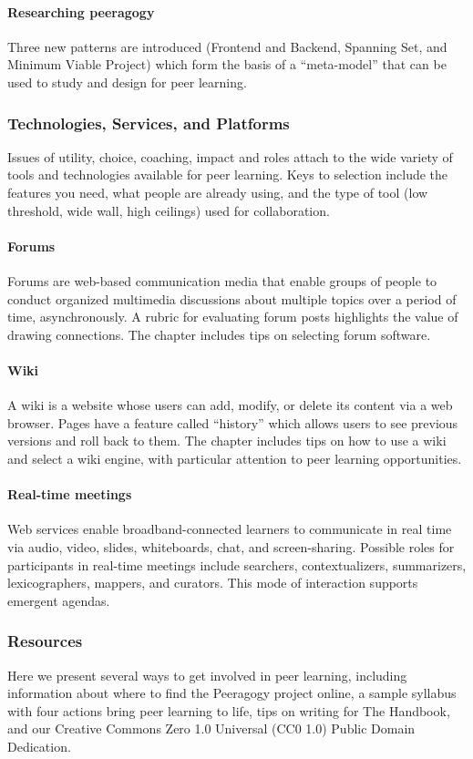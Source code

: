 \paragraph{Researching peeragogy} Three new patterns are introduced
(Frontend and Backend, Spanning Set, and Minimum Viable Project) which
form the basis of a ``meta-model'' that can be used to study and
design for peer learning.

\subsubsection{Technologies, Services, and Platforms}

\noindent Issues of utility, choice, coaching, impact and roles attach
to the wide variety of tools and technologies available for peer
learning. Keys to selection include the features you need, what people
are already using, and the type of tool (low threshold, wide wall,
high ceilings) used for collaboration.

\paragraph{Forums} Forums are web-based communication media
that enable groups of people to conduct organized multimedia discussions
about multiple topics over a period of time, asynchronously. A rubric
for evaluating forum posts highlights the value of drawing connections.
The chapter includes tips on selecting forum software.

\paragraph{Wiki} A
wiki is a website whose users can add, modify, or delete its content via
a web browser. Pages have a feature called ``history'' which allows
users to see previous versions and roll back to them. The chapter
includes tips on how to use a wiki and select a wiki engine, with
particular attention to peer learning opportunities.

 \paragraph{Real-time meetings} Web services enable broadband-connected
learners to communicate in real time via audio, video, slides,
whiteboards, chat, and screen-sharing. Possible roles for participants
in real-time meetings include searchers, contextualizers, summarizers,
lexicographers, mappers, and curators. This mode of interaction
supports emergent agendas.

\subsubsection{Resources}

\noindent Here we present several ways to get involved in peer
learning, including information about where to find the Peeragogy
project online, a sample syllabus with four actions bring peer
learning to life, tips on writing for The Handbook, and our Creative
Commons Zero 1.0 Universal (CC0 1.0) Public Domain Dedication.
